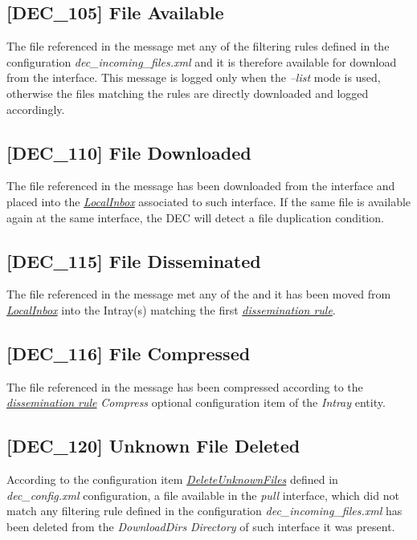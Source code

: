 \documentclass[dec_sum_main.tex]{subfiles}
\begin{document}
\subsection{[DEC\_105] File Available}
The file referenced in the message met any of the filtering rules defined in the configuration \textit{dec\_incoming\_files.xml} and it is therefore available for download from the interface. This message is logged only when the \textit{--list} mode is used, otherwise the files matching the rules are directly downloaded and logged accordingly. 

\subsection{[DEC\_110] File Downloaded}
The file referenced in the message has been downloaded from the interface and placed into the \hyperref[LocalInbox]{\textit{LocalInbox}} associated to such interface. If the same file is available again at the same interface, the DEC will detect a file duplication condition.

\subsection{[DEC\_115] File Disseminated}
The file referenced in the message met any of the and it has been moved from \hyperref[LocalInbox]{\textit{LocalInbox}} into the Intray(s) matching the first \hyperref[Dissemination rules]{\textit{dissemination rule}}.

\subsection{[DEC\_116] File Compressed}
The file referenced in the message has been compressed according to the \hyperref[Dissemination rules]{\textit{dissemination rule}} \textit{Compress} optional configuration item of the \textit{Intray} entity.

\subsection{[DEC\_120] Unknown File Deleted}
According to the configuration item \hyperref[DeleteUnknownFiles]{\textit{DeleteUnknownFiles}} defined in \textit{dec\_config.xml} configuration, a file available in the \textit{pull} interface, which did not match any filtering rule defined in the configuration \textit{dec\_incoming\_files.xml} has been deleted from the \textit{DownloadDirs} \textit{Directory} of such interface it was present.
\end{document}
